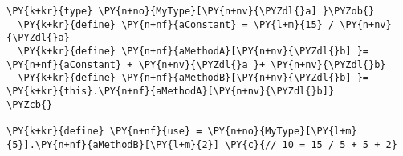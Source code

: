 \begin{Verbatim}[commandchars=\\\{\}]
\PY{k+kr}{type} \PY{n+no}{MyType}[\PY{n+nv}{\PYZdl{}a] }\PYZob{}
  \PY{k+kr}{define} \PY{n+nf}{aConstant} = \PY{l+m}{15} / \PY{n+nv}{\PYZdl{}a}
  \PY{k+kr}{define} \PY{n+nf}{aMethodA}[\PY{n+nv}{\PYZdl{}b] }= \PY{n+nf}{aConstant} + \PY{n+nv}{\PYZdl{}a }+ \PY{n+nv}{\PYZdl{}b}
  \PY{k+kr}{define} \PY{n+nf}{aMethodB}[\PY{n+nv}{\PYZdl{}b] }= \PY{k+kr}{this}.\PY{n+nf}{aMethodA}[\PY{n+nv}{\PYZdl{}b]}
\PYZcb{}

\PY{k+kr}{define} \PY{n+nf}{use} = \PY{n+no}{MyType}[\PY{l+m}{5}].\PY{n+nf}{aMethodB}[\PY{l+m}{2}] \PY{c}{// 10 = 15 / 5 + 5 + 2}
\end{Verbatim}
